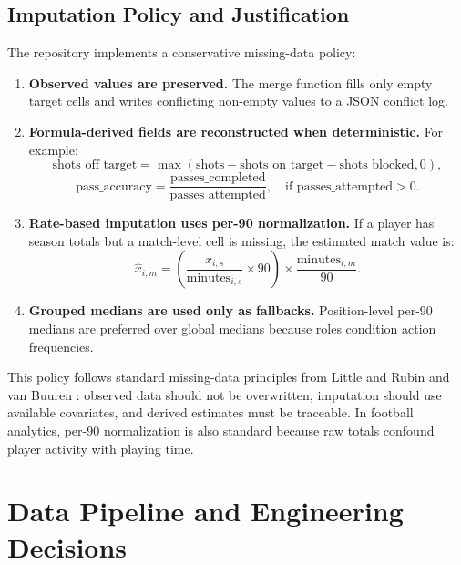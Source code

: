 \documentclass[12pt,a4paper]{article}
\begin{document}
\subsection{Imputation Policy and Justification}
The repository implements a conservative missing-data policy:
\begin{enumerate}
    \item \textbf{Observed values are preserved.} The merge function fills only empty target cells and writes conflicting non-empty values to a JSON conflict log.
    \item \textbf{Formula-derived fields are reconstructed when deterministic.} For example:
    \begin{equation}
        \text{shots\_off\_target} =
        \max(\text{shots} - \text{shots\_on\_target} - \text{shots\_blocked}, 0),
    \end{equation}
    \begin{equation}
        \text{pass\_accuracy} =
        \frac{\text{passes\_completed}}{\text{passes\_attempted}},
        \quad \text{if passes\_attempted} > 0.
    \end{equation}
    \item \textbf{Rate-based imputation uses per-90 normalization.} If a player has season totals but a match-level cell is missing, the estimated match value is:
    \begin{equation}
        \widehat{x}_{i,m} =
        \left(\frac{x_{i,s}}{\text{minutes}_{i,s}}\times 90\right)
        \times
        \frac{\text{minutes}_{i,m}}{90}.
    \end{equation}
    \item \textbf{Grouped medians are used only as fallbacks.} Position-level per-90 medians are preferred over global medians because roles condition action frequencies.
\end{enumerate}
This policy follows standard missing-data principles from Little and Rubin \cite{little_rubin} and van Buuren \cite{van_buuren}: observed data should not be overwritten, imputation should use available covariates, and derived estimates must be traceable. In football analytics, per-90 normalization is also standard because raw totals confound player activity with playing time.

\section{Data Pipeline and Engineering Decisions}
\end{document}
